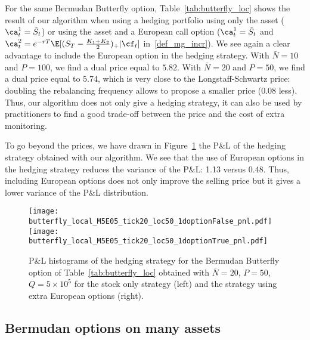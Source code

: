 For the same Bermudan Butterfly option, Table~\ref{tab:butterfly_loc} shows the result  of our algorithm when using a hedging portfolio using only the asset ($\ca^1_t=\tilde{S}_t$) or using the asset and a European call option ($\ca^1_t=\tilde{S}_t$ and $\ca^2_t=e^{-rT }\E[(S_T-\frac{K_1+K_2}2)_+ |\cf_t]$ in~\eqref{def_mg_incr}). We see again a clear advantage to include the European option in the hedging strategy. With $\bar{N}=10$ and $P=100$, we find a dual price equal to $5.82$.
With  $\bar{N}=20$ and $P=50$, we find a dual price equal to $5.74$, which is very close to the Longstaff-Schwartz price: doubling the rebalancing frequency allows to propose a smaller price (0.08 less). Thus, our algorithm does not only give a hedging strategy, it can also be used by practitioners to find a good trade-off between the price and the cost of extra monitoring. 

To go beyond the prices, we have drawn in Figure~\ref{fig:butterfly_loc} the P\&L of the hedging strategy obtained with our algorithm. 
We see that the use of European options in the hedging strategy reduces the variance of the P\&L: 1.13 versus 0.48. Thus, including European options does not only improve the selling price but it gives a lower variance of the P\&L distribution.  

\begin{figure}[h]
  \texttt{[image: butterfly\_local\_M5E05\_tick20\_loc50\_1doptionFalse\_pnl.pdf]}
  \texttt{[image: butterfly\_local\_M5E05\_tick20\_loc50\_1doptionTrue\_pnl.pdf]}
  \caption{P\&L histograms of the hedging strategy for the Bermudan Butterfly option of Table~\ref{tab:butterfly_loc} obtained with $\bar{N}=20$, $P=50$, $Q=5\times 10^5$ for the stock only strategy (left) and the strategy using extra European options (right). } \label{fig:butterfly_loc}
\end{figure}



\subsection{Bermudan options on many assets}

